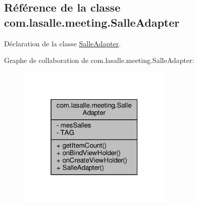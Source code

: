 \hypertarget{classcom_1_1lasalle_1_1meeting_1_1_salle_adapter}{}\subsection{Référence de la classe com.\+lasalle.\+meeting.\+Salle\+Adapter}
\label{classcom_1_1lasalle_1_1meeting_1_1_salle_adapter}


Déclaration de la classe \hyperlink{classcom_1_1lasalle_1_1meeting_1_1_salle_adapter}{Salle\+Adapter}.  




Graphe de collaboration de com.\+lasalle.\+meeting.\+Salle\+Adapter\+:
\nopagebreak
\begin{figure}[H]
\begin{center}
\leavevmode
\includegraphics[width=208pt]{classcom_1_1lasalle_1_1meeting_1_1_salle_adapter__coll__graph}
\end{center}
\end{figure}
